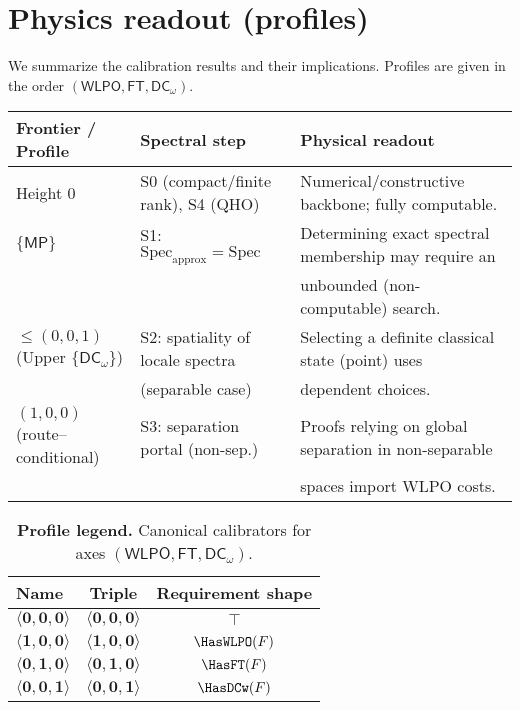 \documentclass[11pt]{article}
\newcommand{\WLPO}{\mathsf{WLPO}}
\newcommand{\FT}{\mathsf{FT}}
\newcommand{\DCw}{\mathsf{DC}_{\omega}}
\newcommand{\MP}{\mathsf{MP}}
\newcommand{\hzero}{\mathbf{0}}
\newcommand{\hone}{\mathbf{1}}
\newcommand{\allzero}{\langle \hzero,\hzero,\hzero\rangle}
\newcommand{\WLPOonly}{\langle \hone,\hzero,\hzero\rangle}
\newcommand{\FTonly}{\langle \hzero,\hone,\hzero\rangle}
\newcommand{\DCwonly}{\langle \hzero,\hzero,\hone\rangle}
\theoremstyle{plain}
\theoremstyle{definition}
\theoremstyle{remark}
\begin{document}
\section{Physics readout (profiles)}

We summarize the calibration results and their implications. Profiles are given in the order $(\WLPO, \FT, \DCw)$.

\begin{center}
\begin{tabular}{|l|l|l|}
\hline
\textbf{Frontier / Profile} & \textbf{Spectral step} & \textbf{Physical readout} \\
\hline
Height $0$ & S0 (compact/finite rank), S4 (QHO) & Numerical/constructive backbone; fully computable. \\
\hline
$\{\MP\}$ & S1: $\mathrm{Spec}_{\mathrm{approx}}=\mathrm{Spec}$ & Determining exact spectral membership may require an \\
& & unbounded (non-computable) search. \\
\hline
$\le (0,0,1)$ (Upper $\{\DCw\}$) & S2: spatiality of locale spectra & Selecting a definite classical state (point) uses \\
& (separable case) & dependent choices. \\
\hline
$(1,0,0)$ (route--conditional) & S3: separation portal (non-sep.) & Proofs relying on global separation in non-separable \\
& & spaces import WLPO costs. \\
\hline
\end{tabular}
\end{center}

\begin{table}[t]
  \centering
  \setlength{\tabcolsep}{8pt}
  \renewcommand{\arraystretch}{1.15}
  \begin{tabular}{l c c}
  \hline
  Name & Triple & Requirement shape \\ \hline
  $\allzero$    & $\langle\hzero,\hzero,\hzero\rangle$ & $\top$ \\
  $\WLPOonly$   & $\langle\hone,\hzero,\hzero\rangle$  & $\HasWLPO(F)$ \\
  $\FTonly$     & $\langle\hzero,\hone,\hzero\rangle$  & $\HasFT(F)$ \\
  $\DCwonly$    & $\langle\hzero,\hzero,\hone\rangle$  & $\HasDCw(F)$ \\
  \hline
  \end{tabular}
  \caption{\textbf{Profile legend.} Canonical calibrators for axes $(\WLPO,\FT,\DCw)$.}
  \label{tab:profile-legend}
\end{table}
\end{document}
